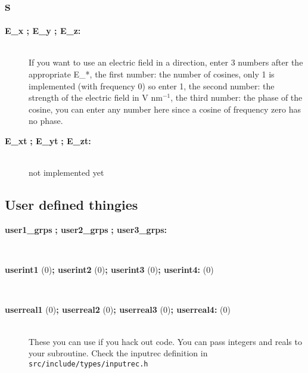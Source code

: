 \subsection{s}
\begin{description}
\item[{\bf E\_x ; E\_y ; E\_z:}]\mbox{}\\
If you want to use an electric field in a direction, enter 3 numbers
after the appropriate E\_*, the first number: the number of cosines,
only 1 is implemented (with frequency 0) so enter 1,
the second number: the strength of the electric field in
V nm$^{-1}$,
the third number: the phase of the cosine, you can enter any number here
since a cosine of frequency zero has no phase.
\item[{\bf E\_xt }{\bf  ;  E\_yt }{\bf  ;  E\_zt: }]\mbox{}\\
not implemented yet
\end{description}

\subsection{User defined thingies}
\begin{description}
\item[{\bf user1\_grps }{\bf  ; user2\_grps }{\bf  ; user3\_grps: }]\mbox{}\\
\item[{\bf userint1 }(0){\bf  ; userint2 }(0){\bf  ; userint3 }(0){\bf  ; userint4: }(0)]\mbox{}\\
\item[{\bf userreal1 }(0){\bf  ; userreal2 }(0){\bf  ; userreal3 }(0){\bf  ; userreal4: }(0)]\mbox{}\\
These you can use if you hack out code. You can pass integers and
reals to your subroutine. Check the inputrec definition in
{\tt src/include/types/inputrec.h}
\end{description}

